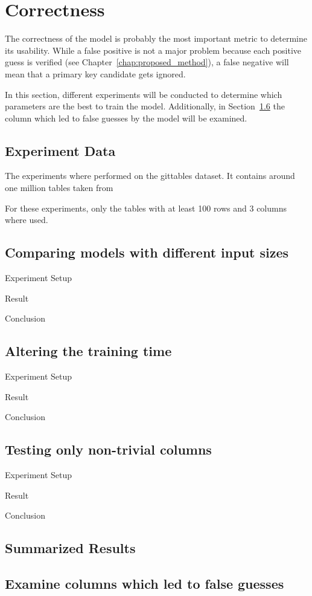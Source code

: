 \section{Correctness}\label{sec:correctness}
The correctness of the model is probably the most important metric to determine its usability. While a false positive is not a major problem because each positive guess is verified (see Chapter~\ref{chap:proposed_method}), a false negative will mean that a primary key candidate gets ignored.

In this section, different experiments will be conducted to determine which parameters are the best to train the model. Additionally, in Section~\ref{subsec:correctness_examine-false-guesses} the column which led to false guesses by the model will be examined.


\subsection{Experiment Data}\label{subsec:correctness_experiment-data} %
The experiments where performed on the gittables dataset\cite{gittables-article}. It contains around one million tables taken from %

For these experiments, only the tables with at least 100 rows and 3 columns where used. %


\subsection{Comparing models with different input sizes}\label{subsec:correctness_comparing-input-size} %
Experiment Setup

Result

Conclusion

\subsection{Altering the training time}\label{subsec:correctness_comparing-training-time} %
Experiment Setup

Result

Conclusion

\subsection{Testing only non-trivial columns}\label{subsec:correctness_non-trivial-columns} %
Experiment Setup

Result

Conclusion

\subsection{Summarized Results}\label{subsec:correctness_conclusions} %

\subsection{Examine columns which led to false guesses}\label{subsec:correctness_examine-false-guesses} %
